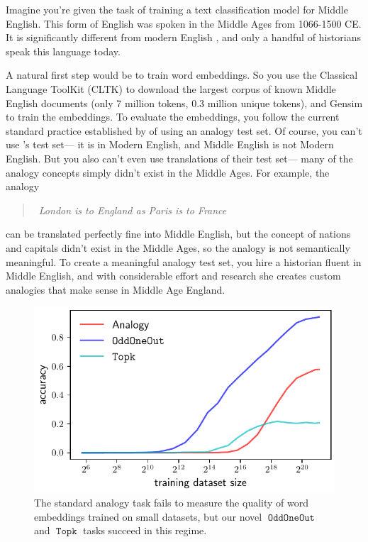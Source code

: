 \documentclass[11pt,a4paper]{article}
\DeclareMathOperator{\OddOneOut}{\texttt{OddOneOut}}
\DeclareMathOperator{\topk}{\texttt{Topk}}
\begin{document}
Imagine you're given the task of training a text classification model for Middle English.
This form of English was spoken in the Middle Ages from 1066-1500 CE.
It is significantly different from modern English \citep{chamonikolasova2014middle},
and only a handful of historians speak this language today.

A natural first step would be to train word embeddings.
So you use the Classical Language ToolKit (CLTK) \citep{johnson2014} to download the largest corpus of known Middle English documents (only 7 million tokens, 0.3 million unique tokens),
and Gensim \citep{rehurek_lrec} to train the embeddings.
To evaluate the embeddings, you follow the current standard practice established by \citet{mikolov2013efficient} of using an analogy test set.
Of course, you can't use \citet{mikolov2013efficient}'s test set---%
it is in Modern English,
and Middle English is not Modern English.
But you also can't even use translations of their test set---%
many of the analogy concepts simply didn't exist in the Middle Ages.
For example, the analogy
\begin{quote}
    ~\!\!\!\!\!\!\emph{London is to England as Paris is to France}
\end{quote}
can be translated perfectly fine into Middle English,
but the concept of nations and capitals didn't exist in the Middle Ages,
so the analogy is not semantically meaningful.
To create a meaningful analogy test set, you hire a historian fluent in Middle English,
and with considerable effort and research she creates custom analogies that make sense in Middle Age England.

\begin{figure}
\centering
\includegraphics[width=1\columnwidth]{size_vs_acc.pdf} 
\caption{
    The standard analogy task \citep{mikolov2013efficient} fails to measure the quality of word embeddings trained on small datasets,
but our novel $\OddOneOut$ and $\topk$ tasks succeed in this regime.
}
\label{fig:size_vs_acc}
\end{figure}
\end{document}

